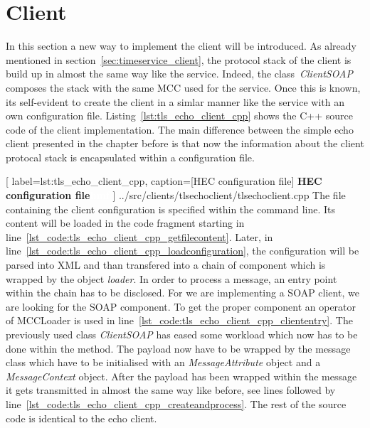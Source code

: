 \clearpage
\section{Client}

In this section a new way to implement the client will be introduced. As already mentioned in section~\ref{sec:timeservice_client}, the protocol stack of the client is build up in almost the same way like the service. Indeed, the class~\textit{ClientSOAP} composes the stack with the same MCC used for the service. Once this is known, its self-evident to create the client in a simlar manner like the service with an own configuration file.
Listing~\ref{lst:tls_echo_client_cpp} shows the C++ source code of the client implementation. The main difference between the simple echo client presented in the chapter before is that now the information about the client protocal stack is encapsulated within a configuration file.

	[
	label=lst:tls_echo_client_cpp,
	caption={[HEC configuration file]
	\textbf{HEC configuration file\textcolor{white}{hmf}}}
	]
{../src/clients/tlsechoclient/tlsechoclient.cpp}
The file containing the client configuration is specified within the command line. 
Its content will be loaded in the code fragment starting in line~\ref{lst_code:tls_echo_client_cpp_getfilecontent}. 
Later, in line~\ref{lst_code:tls_echo_client_cpp_loadconfiguration}, the configuration will be parsed into XML and than transfered into a chain of component which is wrapped by the object \textit{loader}. In order to process a message, an entry point within the chain has to be disclosed. For we are implementing a SOAP client, we are looking for the SOAP component. 
To get the proper component an operator of MCCLoader is used in line~\ref{lst_code:tls_echo_client_cpp_cliententry}.
The previously used class \textit{ClientSOAP} has eased some workload which now has to be done within the method.
The payload now have to be wrapped by the message class which have to be initialised with an \textit{MessageAttribute} object and a \textit{MessageContext} object. After the payload has been wrapped within the message it gets transmitted in almost the same way like before, see lines followed by line~\ref{lst_code:tls_echo_client_cpp_createandprocess}. The rest of the source code is identical to the echo client.\\











